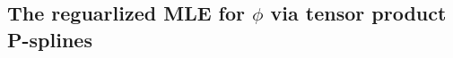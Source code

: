 \documentclass[12pt]{article}
\newcommand{\vphistar}{\mbox{\boldmath $\phi$}}
\newcommand{\vsigmasq}{\mbox{\boldmath $\sigma^2$}}
\theoremstyle{definition}
\begin{document}
\subsection{The reguarlized MLE for $\phi$ via tensor product P-splines}
 


%
%
%
%
%
\end{document}

